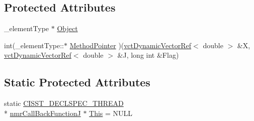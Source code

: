 \subsection*{Protected Attributes}
\begin{DoxyCompactItemize}
\item 
\-\_\-element\-Type $\ast$ \hyperlink{classnmr_call_back_function_j_a5c9d04ecebcf7162bdd42da632c59b7d}{Object}
\item 
int(\-\_\-element\-Type\-::$\ast$ \hyperlink{classnmr_call_back_function_j_a519089e854d5d62ae3330d83e3a837ed}{Method\-Pointer} )(\hyperlink{classvct_dynamic_vector_ref}{vct\-Dynamic\-Vector\-Ref}$<$ double $>$ \&X, \hyperlink{classvct_dynamic_vector_ref}{vct\-Dynamic\-Vector\-Ref}$<$ double $>$ \&J, long int \&Flag)
\end{DoxyCompactItemize}
\subsection*{Static Protected Attributes}
\begin{DoxyCompactItemize}
\item 
static \hyperlink{nmr_call_back_8h_a6e1f65051a0942715fa65ef4193e39e1}{C\-I\-S\-S\-T\-\_\-\-D\-E\-C\-L\-S\-P\-E\-C\-\_\-\-T\-H\-R\-E\-A\-D} \\*
\hyperlink{classnmr_call_back_function_j}{nmr\-Call\-Back\-Function\-J} $\ast$ \hyperlink{classnmr_call_back_function_j_a5d6cc7cb52026f09dce7a569ad2e46ca}{This} = N\-U\-L\-L
\end{DoxyCompactItemize}


